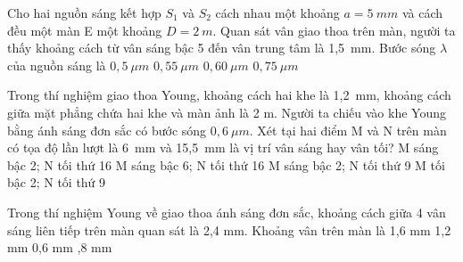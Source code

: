 \begin{vidu}%
Cho hai nguồn sáng kết hợp $S_1$ và $S_2$ cách nhau một khoảng $a=5\ mm$ và cách đều một màn E một khoảng $D=2\ m$. Quan sát vân giao thoa trên màn, người ta thấy khoảng cách từ vân sáng bậc 5 đến vân trung tâm là 1,5\ mm. Bước sóng $\lambda$ của nguồn sáng là
\choice
{$0,5\ \mu m$}
{$0,55\ \mu m$}
{$0,60 \ \mu m$}
{\True $0,75\ \mu m$}
\end{vidu} %
\begin{vidu}%
Trong thí nghiệm giao thoa Young, khoảng cách hai khe là 1,2\ mm, khoảng cách giữa mặt phẳng chứa hai khe và màn ảnh là 2 m. Người ta chiếu vào khe Young bằng ánh sáng đơn sắc có bước sóng $ 0,6\ \mu m $. Xét tại hai điểm M và N trên màn có tọa độ lần lượt là 6\ mm và 15,5\ mm là vị trí vân sáng hay vân tối?
\choice
{M sáng bậc 2; N tối thứ 16}
{\True M sáng bậc 6; N tối thứ 16}
{M sáng bậc 2; N tối thứ 9}
{M tối bậc 2; N tối thứ 9}
\end{vidu} %
\begin{vidu} %
 Trong thí nghiệm Young về giao thoa ánh sáng đơn sắc, khoảng cách giữa 4 vân sáng liên tiếp trên màn quan sát là 2,4 mm. Khoảng vân trên màn là
\choice
{1,6 mm}
{1,2 mm}
{0,6 mm}
{,8 mm}
\end{vidu} %
